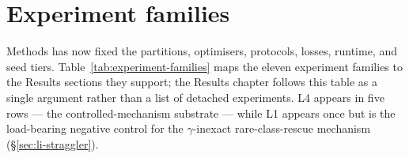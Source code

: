 \documentclass[11pt,a4paper]{report}
\begin{document}
\section{Experiment families}
\label{sec:method-roadmap}

Methods has now fixed the partitions, optimisers, protocols, losses, runtime, and
seed tiers. Table~\ref{tab:experiment-families} maps the eleven experiment families
to the Results sections they support; the Results chapter follows this table as a
single argument rather than a list of detached experiments. L4 appears in five
rows --- the controlled-mechanism substrate --- while L1 appears once but is the
load-bearing negative control for the $\gamma$-inexact rare-class-rescue mechanism
(\S\ref{sec:li-straggler}).

\begin{table}[H]
\centering
\small
\caption{Experiment families and the Results sections they support. The
table bridges the design choices defined in §\ref{sec:method-problem}--§\ref{sec:method-losses}
and Results (Chapter~\ref{ch:results}). Each Results section examines
one row or a group of rows; none is presented as a detached standalone
experiment.}
\label{tab:experiment-families}
\end{table}
\end{document}
